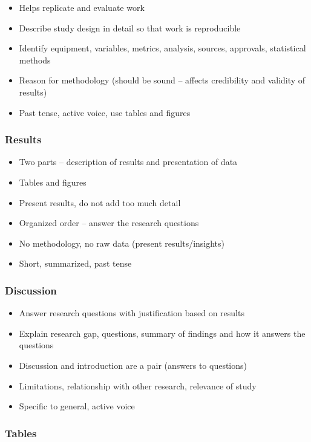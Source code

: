 \documentclass{article}
\begin{document}
\begin{itemize}
    \item Helps replicate and evaluate work
    \item Describe study design in detail so that work is reproducible
    \item Identify equipment, variables, metrics, analysis, sources, approvals, statistical methods
    \item Reason for methodology (should be sound -- affects credibility and validity of results)
    \item Past tense, active voice, use tables and figures
\end{itemize}

\subsubsection{Results}

\begin{itemize}
    \item Two parts -- description of results and presentation of data
    \item Tables and figures
    \item Present results, do not add too much detail
    \item Organized order -- answer the research questions
    \item No methodology, no raw data (present results/insights)
    \item Short, summarized, past tense
\end{itemize}

\subsubsection{Discussion}

\begin{itemize}
    \item Answer research questions with justification based on results
    \item Explain research gap, questions, summary of findings and how it answers the questions
    \item Discussion and introduction are a pair (answers to questions)
    \item Limitations, relationship with other research, relevance of study
    \item Specific to general, active voice
\end{itemize}

\subsubsection{Tables}
\end{document}
